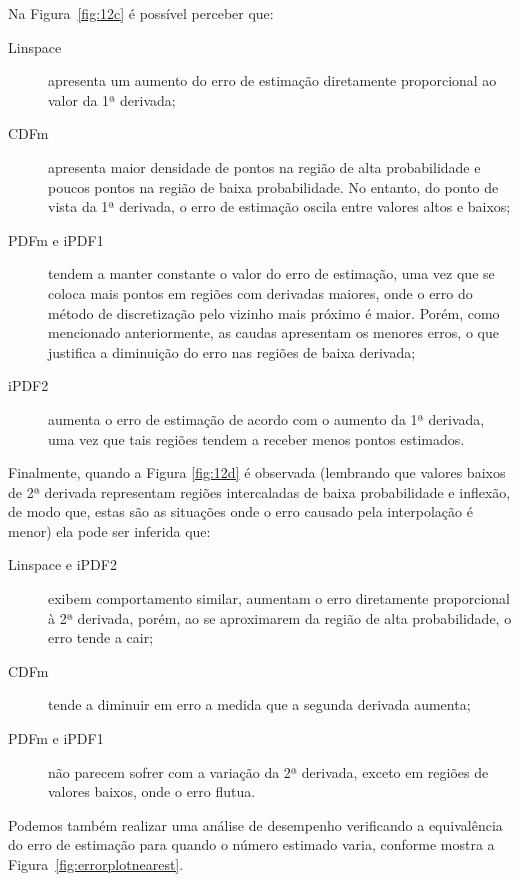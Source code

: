 Na Figura~\ref{fig:12c} é possível perceber que:
 \begin{description}
	\item[Linspace] apresenta um aumento do erro de estimação diretamente proporcional ao valor da 1ª derivada;
	\item[CDFm] apresenta maior densidade de pontos na região de alta probabilidade e poucos pontos na região de baixa probabilidade. No entanto, do ponto de vista da 1ª derivada, o erro de estimação oscila entre valores altos e baixos;
	\item[PDFm e iPDF1] tendem a manter constante o valor do erro de estimação, uma vez que se coloca mais pontos em regiões com derivadas maiores, onde o erro do método de discretização pelo vizinho mais próximo é maior. Porém, como mencionado anteriormente, as caudas apresentam os menores erros, o que justifica a diminuição do erro nas regiões de baixa derivada;
	\item[iPDF2] aumenta o erro de estimação de acordo com o aumento da 1ª derivada, uma vez que tais regiões tendem a receber menos pontos estimados.
\end{description}  

Finalmente, quando a Figura \ref{fig:12d} é observada (lembrando que valores baixos de 2ª derivada representam regiões intercaladas de baixa probabilidade e inflexão, de modo que, estas são as situações onde o erro causado pela interpolação é menor) ela pode ser inferida que:

\begin{description}
	\item[Linspace e iPDF2] exibem comportamento similar, aumentam o erro diretamente proporcional à 2ª derivada, porém, ao se aproximarem da região de alta probabilidade, o erro tende a cair;
	\item[CDFm] tende a diminuir em erro a medida que a segunda derivada aumenta;
	\item[PDFm e iPDF1] não parecem sofrer com a variação da 2ª derivada, exceto em regiões de valores baixos, onde o erro flutua.
\end{description}

Podemos também realizar uma análise de desempenho verificando a equivalência do erro de estimação para quando o número estimado varia, conforme mostra a Figura~\ref{fig:errorplotnearest}.

